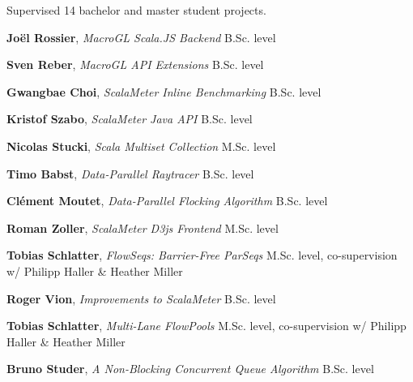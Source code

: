 \documentclass[9pt]{article}
\begin{document}
\begin{easylist}[itemize]
\noindent
Supervised 14 bachelor and master student projects.
\newline

\noindent
{\bf Joël Rossier},
{\em MacroGL Scala.JS Backend}
\newline\noindent B.Sc. level
\medskip

\noindent
{\bf Sven Reber},
{\em MacroGL API Extensions}
\newline\noindent B.Sc. level
\medskip

\noindent
{\bf Gwangbae Choi},
{\em ScalaMeter Inline Benchmarking}
\newline\noindent B.Sc. level
\medskip

\noindent
{\bf Kristof Szabo},
{\em ScalaMeter Java API}
\newline\noindent B.Sc. level
\medskip

\noindent
{\bf Nicolas Stucki},
{\em Scala Multiset Collection}
\newline\noindent M.Sc. level
\medskip

\noindent
{\bf Timo Babst},
{\em Data-Parallel Raytracer}
\newline\noindent B.Sc. level
\medskip

\noindent
{\bf Clément Moutet},
{\em Data-Parallel Flocking Algorithm}
\newline\noindent B.Sc. level
\medskip

\noindent
{\bf Roman Zoller},
{\em ScalaMeter D3js Frontend}
\newline\noindent M.Sc. level
\medskip

\noindent
{\bf Tobias Schlatter},
{\em FlowSeqs: Barrier-Free ParSeqs}
\newline\noindent M.Sc. level, co-supervision w/ Philipp Haller \& Heather Miller
\medskip

\noindent
{\bf Roger Vion},
{\em Improvements to ScalaMeter}
\newline\noindent B.Sc. level
\medskip

\noindent
{\bf Tobias Schlatter},
{\em Multi-Lane FlowPools}
\newline\noindent M.Sc. level, co-supervision w/ Philipp Haller \& Heather Miller
\medskip

\noindent
{\bf Bruno Studer},
{\em A Non-Blocking Concurrent Queue Algorithm}
\newline\noindent B.Sc. level
\medskip


\end{easylist}
\end{document}
